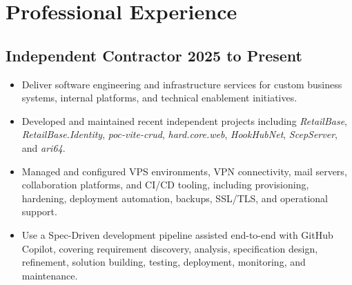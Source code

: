\section*{Professional Experience}

\subsection*{Independent Contractor \hfill 2025 to Present}
\begin{itemize}[leftmargin=12pt]
    \item Deliver software engineering and infrastructure services for custom business systems, internal platforms, and technical enablement initiatives.
    \item Developed and maintained recent independent projects including \textit{RetailBase}, \textit{RetailBase.Identity}, \textit{poc-vite-crud}, \textit{hard.core.web}, \textit{HookHubNet}, \textit{ScepServer}, and \textit{ari64}.
    \item Managed and configured VPS environments, VPN connectivity, mail servers, collaboration platforms, and CI/CD tooling, including provisioning, hardening, deployment automation, backups, SSL/TLS, and operational support.
    \item Use a Spec-Driven development pipeline assisted end-to-end with GitHub Copilot, covering requirement discovery, analysis, specification design, refinement, solution building, testing, deployment, monitoring, and maintenance.
\end{itemize}

